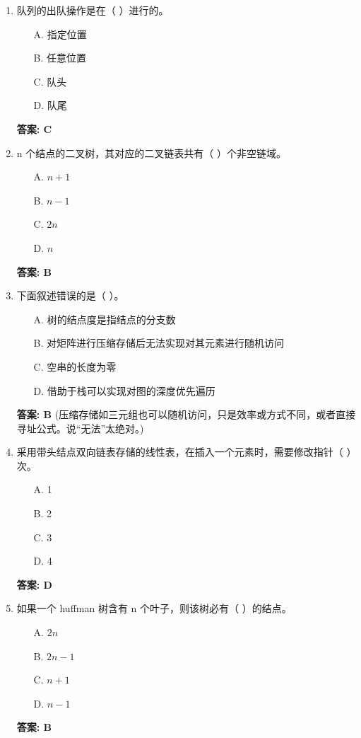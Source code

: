 \documentclass[12pt, a4paper]{article}
\begin{document}
\begin{enumerate}
    \item 队列的出队操作是在（ ）进行的。
    \begin{enumerate}
        \item[A.] 指定位置
        \item[B.] 任意位置
        \item[C.] 队头
        \item[D.] 队尾
    \end{enumerate}
    \textbf{答案: C}

    \item n 个结点的二叉树，其对应的二叉链表共有（ ）个非空链域。
    \begin{enumerate}
        \item[A.] $n+1$
        \item[B.] $n-1$
        \item[C.] $2n$
        \item[D.] $n$
    \end{enumerate}
    \textbf{答案: B}

    \item 下面叙述错误的是（ ）。
    \begin{enumerate}
        \item[A.] 树的结点度是指结点的分支数
        \item[B.] 对矩阵进行压缩存储后无法实现对其元素进行随机访问
        \item[C.] 空串的长度为零
        \item[D.] 借助于栈可以实现对图的深度优先遍历
    \end{enumerate}
    \textbf{答案: B} (压缩存储如三元组也可以随机访问，只是效率或方式不同，或者直接寻址公式。说“无法”太绝对。)

    \item 采用带头结点双向链表存储的线性表，在插入一个元素时，需要修改指针（ ）次。
    \begin{enumerate}
        \item[A.] 1
        \item[B.] 2
        \item[C.] 3
        \item[D.] 4
    \end{enumerate}
    \textbf{答案: D}

    \item 如果一个 huffman 树含有 n 个叶子，则该树必有（ ）的结点。
    \begin{enumerate}
        \item[A.] $2n$
        \item[B.] $2n-1$
        \item[C.] $n+1$
        \item[D.] $n-1$
    \end{enumerate}
    \textbf{答案: B}


\end{enumerate}
\end{document}

